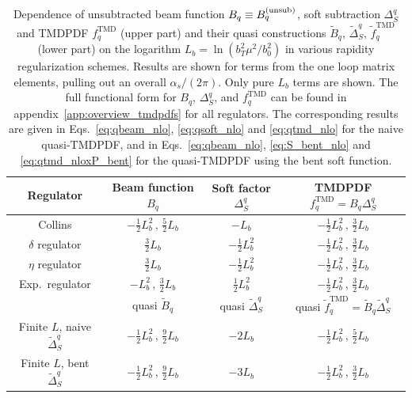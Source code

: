 \documentclass[11pt,a4paper]{article}
\DeclareRobustCommand{\app}[1]{appendix~\ref{app:#1}}
\newcommand{\as}{\alpha_s}
\newcommand\TMD{\mathrm{TMD}}
\newcommand{\unsub}{{\rm(unsub)}}
\begin{document}
{
\renewcommand{\arraystretch}{1.4}
\begin{table}[t!]
 \centering
 \begin{tabular}{|c|c|c|c|}
  \hline
  Regulator & Beam function $B_q$ & Soft factor $\Delta_S^q$ & TMDPDF $f_q^\TMD = B_q \Delta_S^q$
  \\ \hline
  Collins \cite{Collins:1350496}
  & $-\frac12 L_b^2 \,,\, \frac52 L_b$
  & $- L_b$
  & $-\frac12 L_b^2 \,,\, \frac32 L_b$
  \\ \hline
  $\delta$ regulator \cite{GarciaEchevarria:2011rb,Echevarria:2012js}
  & $\frac32 L_b$
  & $-\frac12 L_b^2$
  & $-\frac12 L_b^2 \,,\, \frac32 L_b$
  \\ \hline
  $\eta$ regulator \cite{Chiu:2011qc,Chiu:2012ir}
  & $\frac32 L_b$
  & $-\frac12 L_b^2$
  & $-\frac12 L_b^2 \,,\, \frac32 L_b$
  \\ \hline
  Exp.~regulator \cite{Li:2016axz}
  & $-L_b^2 \,,\, \frac32 L_b$
  & $\frac12 L_b^2$
  & $-\frac12 L_b^2 \,,\, \frac32 L_b$
  \\ \hline
  & quasi $\tilde B_q$ & quasi $\tilde\Delta_S^q$ & quasi $\tilde f_q^\TMD = \tilde B_q \tilde \Delta_S^q$
  \\ \hline
  Finite $L$, naive $\tilde \Delta_S^q$
  & $-\frac12 L_b^2 \,,\, \frac92 L_b$
  & $-2 L_b$
  & $-\frac12 L_b^2 \,,\, \frac52 L_b$
  \\ \hline
  Finite $L$, bent $\tilde \Delta_S^q$
  & $-\frac12 L_b^2 \,,\, \frac92 L_b$
  & $-3 L_b$
  & $-\frac12 L_b^2 \,,\, \frac32 L_b$
  \\ \hline
 \end{tabular}
 \caption{Dependence of unsubtracted beam function $B_q \equiv B_q^\unsub$, soft subtraction $\Delta_S^q$ and TMDPDF $f_q^\TMD$ (upper part) and their quasi constructions $\tilde B_q$, $\tilde\Delta_S^q$, $\tilde f_q^\TMD$ (lower part) on the logarithm $L_b = \ln(b_T^2 \mu^2 / b_0^2)$ in  various rapidity regularization schemes. Results are shown for terms from the one loop matrix elements, pulling out an overall $\as/(2\pi)$.
 Only pure $L_b$ terms are shown. The full functional form for $B_q$, $\Delta_S^q$, and $f_q^\TMD$ can be found in \app{overview_tmdpdfs} for all regulators.
 The corresponding results are given in Eqs.\ \eqref{eq:qbeam_nlo}, \eqref{eq:qsoft_nlo} and \eqref{eq:qtmd_nlo} for the naive quasi-TMDPDF, and in Eqs.\ \eqref{eq:qbeam_nlo}, \eqref{eq:S_bent_nlo} and \eqref{eq:qtmd_nloxP_bent} for the quasi-TMDPDF using the bent soft function.
 }
 \label{tbl:LogB}
\end{table}
}
\end{document}
